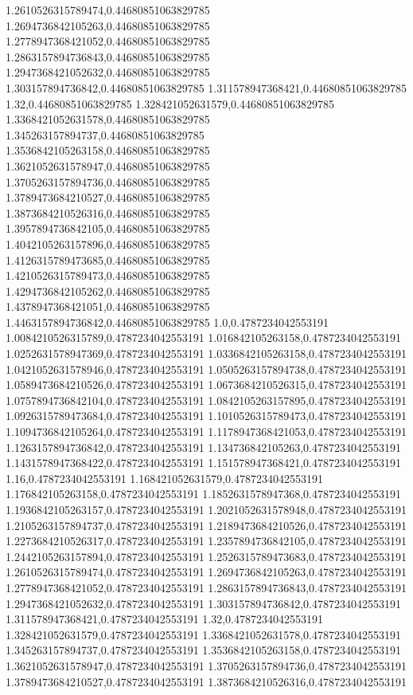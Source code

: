 1.2610526315789474,0.44680851063829785
1.2694736842105263,0.44680851063829785
1.2778947368421052,0.44680851063829785
1.2863157894736843,0.44680851063829785
1.2947368421052632,0.44680851063829785
1.303157894736842,0.44680851063829785
1.311578947368421,0.44680851063829785
1.32,0.44680851063829785
1.328421052631579,0.44680851063829785
1.3368421052631578,0.44680851063829785
1.345263157894737,0.44680851063829785
1.3536842105263158,0.44680851063829785
1.3621052631578947,0.44680851063829785
1.3705263157894736,0.44680851063829785
1.3789473684210527,0.44680851063829785
1.3873684210526316,0.44680851063829785
1.3957894736842105,0.44680851063829785
1.4042105263157896,0.44680851063829785
1.4126315789473685,0.44680851063829785
1.4210526315789473,0.44680851063829785
1.4294736842105262,0.44680851063829785
1.4378947368421051,0.44680851063829785
1.4463157894736842,0.44680851063829785
1.0,0.4787234042553191
1.0084210526315789,0.4787234042553191
1.016842105263158,0.4787234042553191
1.0252631578947369,0.4787234042553191
1.0336842105263158,0.4787234042553191
1.0421052631578946,0.4787234042553191
1.0505263157894738,0.4787234042553191
1.0589473684210526,0.4787234042553191
1.0673684210526315,0.4787234042553191
1.0757894736842104,0.4787234042553191
1.0842105263157895,0.4787234042553191
1.0926315789473684,0.4787234042553191
1.1010526315789473,0.4787234042553191
1.1094736842105264,0.4787234042553191
1.1178947368421053,0.4787234042553191
1.1263157894736842,0.4787234042553191
1.134736842105263,0.4787234042553191
1.1431578947368422,0.4787234042553191
1.151578947368421,0.4787234042553191
1.16,0.4787234042553191
1.168421052631579,0.4787234042553191
1.176842105263158,0.4787234042553191
1.1852631578947368,0.4787234042553191
1.1936842105263157,0.4787234042553191
1.2021052631578948,0.4787234042553191
1.2105263157894737,0.4787234042553191
1.2189473684210526,0.4787234042553191
1.2273684210526317,0.4787234042553191
1.2357894736842105,0.4787234042553191
1.2442105263157894,0.4787234042553191
1.2526315789473683,0.4787234042553191
1.2610526315789474,0.4787234042553191
1.2694736842105263,0.4787234042553191
1.2778947368421052,0.4787234042553191
1.2863157894736843,0.4787234042553191
1.2947368421052632,0.4787234042553191
1.303157894736842,0.4787234042553191
1.311578947368421,0.4787234042553191
1.32,0.4787234042553191
1.328421052631579,0.4787234042553191
1.3368421052631578,0.4787234042553191
1.345263157894737,0.4787234042553191
1.3536842105263158,0.4787234042553191
1.3621052631578947,0.4787234042553191
1.3705263157894736,0.4787234042553191
1.3789473684210527,0.4787234042553191
1.3873684210526316,0.4787234042553191

